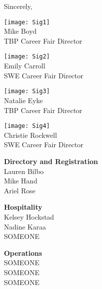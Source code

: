 \documentclass[twoside]{article}
\begin{document}
Sincerely, \begin{multicols}{2}
	\begin{minipage}{\columnwidth}
			\texttt{[image: Sig1]}\\
			Mike Boyd\\
			TBP Career Fair Director\\
			\end{minipage}
\begin{minipage}{\columnwidth}
			\texttt{[image: Sig2]}\\
			Emily Carroll\\
			SWE Career Fair Director\\
			\end{minipage}
\begin{minipage}{\columnwidth}
			\texttt{[image: Sig3]}\\
			Natalie Eyke\\
			TBP Career Fair Director\\
			\end{minipage}
\begin{minipage}{\columnwidth}
			\texttt{[image: Sig4]}\\
			Christie Rockwell\\
			SWE Career Fair Director\\
			\end{minipage}
\end{multicols}\begin{multicols}{2}
	\begin{minipage}{\columnwidth}
	{\bf Directory and Registration}\\
	Lauren Bilbo\\
	Mike Hand\\
	Ariel Rose\\
	
\end{minipage}
	\begin{minipage}{\columnwidth}
	{\bf Hospitality}\\
	Kelsey Hockstad\\
	Nadine Karaa\\
	SOMEONE\\
	
\end{minipage}
	\begin{minipage}{\columnwidth}
	{\bf Operations}\\
	SOMEONE\\
	SOMEONE\\
	SOMEONE\\
	

\end{minipage}
\end{multicols}
\end{document}
